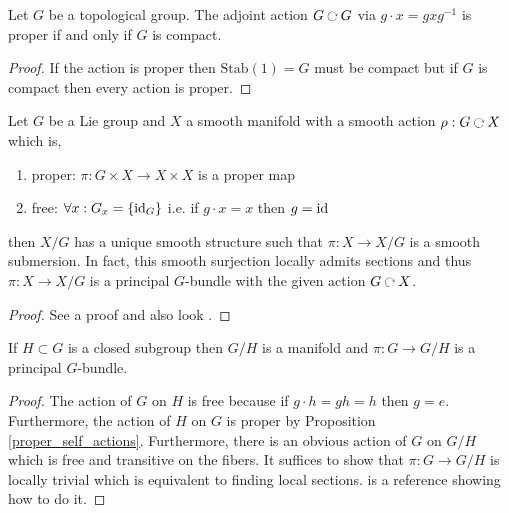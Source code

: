\documentclass[12pt]{article}
\begin{document}
\begin{proposition}
Let $G$ be a topological group. The adjoint action $G \acts G$ via $g \cdot x = gxg^{-1}$ is proper if and only if $G$ is compact.
\end{proposition}

\begin{proof}
If the action is proper then $\mathrm{Stab}(1) = G$ must be compact but if $G$ is compact then every action is proper. 
\end{proof}


\begin{theorem}
Let $G$ be a Lie group and $X$ a smooth manifold with a smooth action $\rho : G \acts X$ which is,
\begin{enumerate}
\item proper: $\pi : G \times X \to X \times X$ is a proper map
\item free: $\forall x : G_x = \left\{ \mathrm{id}_G \right\}$ i.e. if $g \cdot x = x$ then $g = \mathrm{id}$
\end{enumerate}
then $X / G$ has a unique smooth structure such that $\pi : X \to X / G$ is a smooth submersion. In fact, this smooth surjection locally admits sections and thus $\pi : X \to X / G$ is a principal $G$-bundle with the given action $G \acts X$.
\end{theorem}

\begin{proof}
See a proof  and also look .
\end{proof}

\begin{corollary} \label{quotient_principal_bundle}
If $H \subset G$ is a closed subgroup then $G / H$ is a manifold and $\pi : G \to G/H$ is a principal $G$-bundle.
\end{corollary}

\begin{proof}
The action of $G$ on $H$ is free because if $g \cdot h = gh = h$ then $g = e$. Furthermore, the action of $H$ on $G$ is proper by Proposition \ref{proper_self_actions}. Furthermore, there is an obvious action of $G$ on $G/H$ which is free and transitive on the fibers. It suffices to show that $\pi : G \to G/H$ is locally trivial which is equivalent to finding local sections.  is a reference showing how to do it.
\end{proof}
\end{document}
